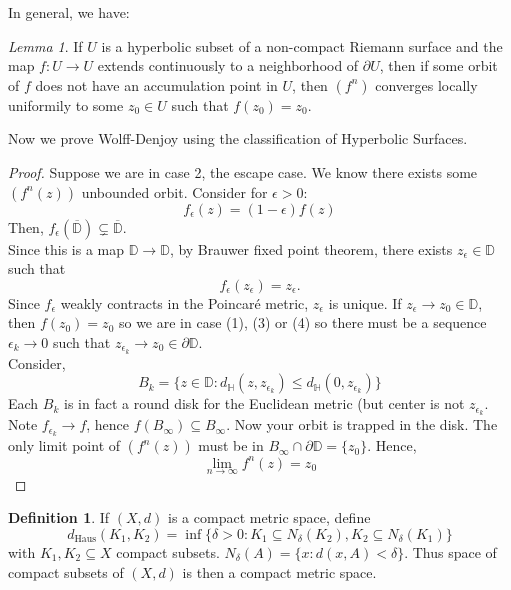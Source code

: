 \documentclass[a4paper, 11pt]{book}
\theoremstyle{definition}
\newtheorem{definition}{Definition}[section]
\theoremstyle{remark}
\newtheorem{lemma}[theorem]{Lemma}
\begin{document}
    In general, we have:
    \begin{lemma}
        If $U$ is a hyperbolic subset of a non-compact Riemann surface and the map $f:U\to U$ extends continuously to a neighborhood
        of $\partial U$, then if some orbit of $f$ does not have an accumulation point in $U$, then $(f^n)$ converges locally
        uniformily to some $z_0\in U$ such that $f(z_0) = z_0$.
    \end{lemma}

    Now we prove Wolff-Denjoy using the classification of Hyperbolic Surfaces.
    \begin{proof}
        Suppose we are in case 2, the escape case. We know there exists some $(f^n(z))$ unbounded orbit. Consider for
        $\epsilon>0$:
        \[ f_{\epsilon}(z) = (1-\epsilon) f(z) \]
        Then, $f_{\epsilon}(\overline{\mathbb{D}})\subsetneq \overline{\mathbb{D}}$.\\
        Since this is a map $\mathbb{D}\to\mathbb{D}$, by Brauwer fixed point theorem, there exists $z_{\epsilon}\in\mathbb{D}$
        such that 
        \[ f_{\epsilon}(z_{\epsilon}) = z_{\epsilon}. \]
        Since $f_{\epsilon}$ weakly contracts in the Poincaré metric, $z_{\epsilon}$ is unique. If $z_{\epsilon}\to z_0\in\mathbb{D}$,
        then $f(z_0) = z_0$ so we are in case (1), (3) or (4) so there  must be a sequence $\epsilon_k\to 0$ such that
        $z_{\epsilon_k}\to z_0\in\partial\mathbb{D}$.\\

        Consider,
        \[ B_k = \{z\in\mathbb{D}: d_{\mathbb{H}}(z,z_{\epsilon_k}) \leq d_{\mathbb{H}}(0,z_{\epsilon_k})\} \]
        Each $B_k$ is in fact a round disk for the Euclidean metric (but center is not $z_{\epsilon_k}$. Note $f_{\epsilon_k}\to f$,
        hence $f(B_{\infty})\subseteq B_{\infty}$. Now your orbit is trapped in the disk. The only limit point of
        $(f^n(z))$ must be in $B_{\infty}\cap\partial\mathbb{D} = \{z_0\}$. Hence,
        \[ \lim_{n\to\infty} f^n(z) = z_0 \]
    \end{proof}

    \begin{definition}
        If $(X,d)$ is a compact metric space, define
        \[ d_{\text{Haus}}(K_1,K_2) = \inf\{\delta>0:K_1\subseteq N_{\delta}(K_2),K_2\subseteq N_{\delta}(K_1)\} \]
        with $K_1,K_2\subseteq X$ compact subsets. $N_{\delta}(A) = \{x:d(x,A)<\delta\}$. Thus space of compact subsets of
        $(X,d)$ is then a compact metric space.
    \end{definition}
\end{document}

